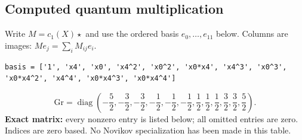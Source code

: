\documentclass[10pt,a4paper]{article}
\begin{document}
\subsection*{Computed quantum multiplication}
Write $M=c_1(X)\star$ and use the ordered basis $e_0,\ldots,e_{11}$ below. Columns are images: $M e_j=\sum_i M_{ij}e_i$.
\begin{lstlisting}
basis = ['1', 'x4', 'x0', 'x4^2', 'x0^2', 'x0*x4', 'x4^3', 'x0^3', 'x0*x4^2', 'x4^4', 'x0*x4^3', 'x0*x4^4']
\end{lstlisting}
\[\mathrm{Gr}=\operatorname{diag}\!\left(- \frac{5}{2},- \frac{3}{2},- \frac{3}{2},- \frac{1}{2},- \frac{1}{2},- \frac{1}{2},\frac{1}{2},\frac{1}{2},\frac{1}{2},\frac{3}{2},\frac{3}{2},\frac{5}{2}\right).\]
\textbf{Exact matrix:} every nonzero entry is listed below; all omitted entries are zero. Indices are zero based. No Novikov specialization has been made in this table.
\end{document}
